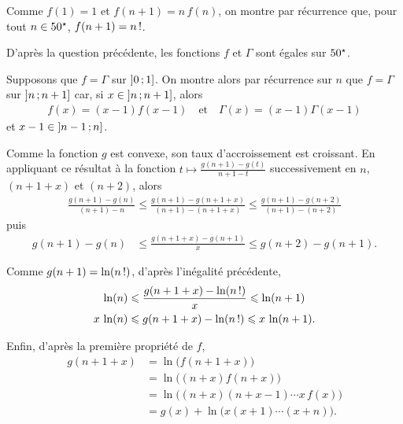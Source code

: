\begin{solution}
\begin{reponses}
\item Comme $f(1) = 1$ et $f(n + 1) = n \, f(n)$, on montre par récurrence que, pour tout $n \in 50^\star$, $f(n+1) = n\,!$.

\item D'après la question précédente, les fonctions $f$ et $\Gamma$ sont égales sur $50^\star$.

Supposons que $f = \Gamma$ sur $\left]0\,;1\right]$. On montre alors par récurrence sur $n$ que $f = \Gamma$ sur $\left]n\,;n + 1\right]$ car, si $x \in \left]n\,;n + 1\right]$, alors
\begin{align*}
f(x) = (x - 1) f(x - 1)
\quad
\text{et}
\quad
\Gamma(x) = (x - 1) \Gamma(x - 1)
\end{align*}
et $x - 1 \in \left]n-1\,;n\right]$.

\item Comme la fonction $g$ est convexe, son taux d'accroissement est croissant. En appliquant ce résultat à la fonction $t \mapsto \frac{g(n + 1) - g(t)}{n + 1 - t}$ successivement en $n$, $(n + 1 + x)$ et $(n + 2)$, alors
\begin{align*}
\frac{g(n + 1) - g(n)}{(n + 1) - n}
\leqslant \frac{g(n + 1) - g(n + 1 + x)}{(n + 1) - (n + 1 + x)}
\leqslant \frac{g(n + 1) - g(n + 2)}{(n + 1) - (n + 2)}
\end{align*}
puis
\begin{align*}
g(n + 1) - g(n) &\leqslant \frac{g(n + 1 + x) - g(n + 1)}{x} \leqslant g(n + 2) - g(n + 1).
\end{align*}

\item Comme $g(n + 1) = \ln(n\,!)$, d'après l'inégalité précédente,
\begin{align*}
\ln(n) &\leqslant \frac{g(n + 1 + x) - \ln(n\,!)}{x} \leqslant \ln(n + 1)\\
x \, \ln(n) &\leqslant g(n + 1 + x) - \ln(n\,!) \leqslant x \, \ln(n + 1).
\end{align*}

Enfin, d'après la première propriété de $f$,
\begin{align*}
g(n + 1 + x)
&= \ln\mathopen{}\big(f(n + 1 + x)\big) \\
&= \ln\mathopen{}\big((n + x) f(n + x)\big) \\
& = \ln\mathopen{}\big((n + x) (n + x - 1) \cdots x \, f(x)\big) \\
&= g(x) + \ln\mathopen{}\big(x (x + 1) \cdots (x + n)\big).
\end{align*}


\end{reponses}
\end{solution}
